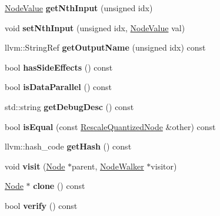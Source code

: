 \begin{DoxyCompactItemize}
\hyperlink{structglow_1_1_node_value}{Node\+Value} {\bfseries get\+Nth\+Input} (unsigned idx)
\item 
\mbox{\label{classglow_1_1_rescale_quantized_node_a1bf9c0b284712c07833c94a308f960e4}} 
void {\bfseries set\+Nth\+Input} (unsigned idx, \hyperlink{structglow_1_1_node_value}{Node\+Value} val)
\item 
\mbox{\label{classglow_1_1_rescale_quantized_node_a1529e084c7318054b97b825e5eca75db}} 
llvm\+::\+String\+Ref {\bfseries get\+Output\+Name} (unsigned idx) const
\item 
\mbox{\label{classglow_1_1_rescale_quantized_node_a2139f2265d097106d65c873a916afdc7}} 
bool {\bfseries has\+Side\+Effects} () const
\item 
\mbox{\label{classglow_1_1_rescale_quantized_node_a03d39474f65318e282e31b6de21c6b7e}} 
bool {\bfseries is\+Data\+Parallel} () const
\item 
\mbox{\label{classglow_1_1_rescale_quantized_node_a4c4bc07ada1141ce2a717e454fca6d37}} 
std\+::string {\bfseries get\+Debug\+Desc} () const
\item 
\mbox{\label{classglow_1_1_rescale_quantized_node_ac27e58ca9cdc2dfb950cd041378dbae1}} 
bool {\bfseries is\+Equal} (const \hyperlink{classglow_1_1_rescale_quantized_node}{Rescale\+Quantized\+Node} \&other) const
\item 
\mbox{\label{classglow_1_1_rescale_quantized_node_a8e9d814c2c2483ab76ee3e173496063a}} 
llvm\+::hash\+\_\+code {\bfseries get\+Hash} () const
\item 
\mbox{\label{classglow_1_1_rescale_quantized_node_ad6c01fab384ae05d1f5617fe400c3c35}} 
void {\bfseries visit} (\hyperlink{classglow_1_1_node}{Node} $\ast$parent, \hyperlink{classglow_1_1_node_walker}{Node\+Walker} $\ast$visitor)
\item 
\mbox{\label{classglow_1_1_rescale_quantized_node_af6c543be34b2e95aee89ff319d552e3d}} 
\hyperlink{classglow_1_1_node}{Node} $\ast$ {\bfseries clone} () const
\item 
\mbox{\label{classglow_1_1_rescale_quantized_node_af67d9a234336c9aef84f8691ecc01291}} 
bool {\bfseries verify} () const
\end{DoxyCompactItemize}
